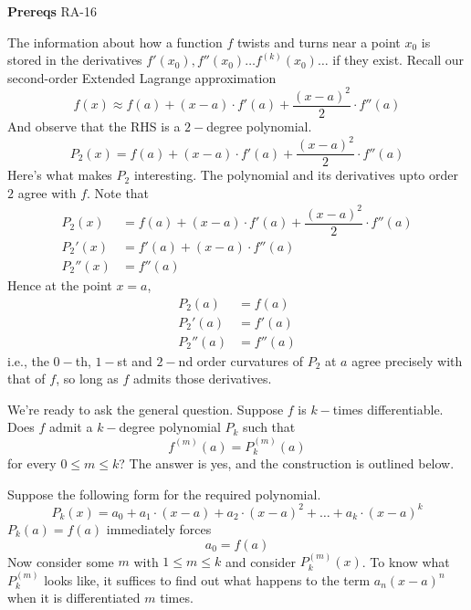 

\textbf{Prereqs} RA-16

The information about how a function $f$ twists and turns near a point $x_0$ is stored in the derivatives $f'(x_0), f''(x_0) \ldots f^{(k)}(x_0) \ldots$ if they exist. Recall our second-order Extended Lagrange approximation
$$
f(x) \approx f(a) + (x - a)\cdot f'(a) + \dfrac{(x - a)^2}{2}\cdot f''(a)
$$
And observe that the RHS is a $2-$degree polynomial.
$$
P_2(x) = f(a) + (x - a)\cdot f'(a) + \dfrac{(x - a)^2}{2}\cdot f''(a)
$$
Here's what makes $P_2$ interesting. The polynomial and its derivatives upto order $2$ agree with $f$. Note that
\begin{align*}
P_2(x) &= f(a) + (x - a)\cdot f'(a) + \dfrac{(x - a)^2}{2}\cdot f''(a)\\
P_2'(x) &= f'(a) + (x - a)\cdot f''(a)\\
P_2''(x) &= f''(a)
\end{align*}
Hence at the point $x = a$,
\begin{align*}
P_2(a) &= f(a)\\
P_2'(a) &= f'(a)\\
P_2''(a) &= f''(a)
\end{align*}
i.e., the $0-$th, $1-$st and $2-$nd order curvatures of $P_2$ at $a$ agree precisely with that of $f$, so long as $f$ admits those derivatives.

We're ready to ask the general question. Suppose $f$ is $k-$times differentiable. Does $f$ admit a $k-$degree polynomial $P_k$ such that
$$
f^{(m)}(a) = P_k^{(m)}(a)
$$
for every $0 \leq m \leq k$? The answer is yes, and the construction is outlined below.

Suppose the following form for the required polynomial.
$$
P_k(x) = a_0 + a_1\cdot (x - a) + a_2\cdot (x - a)^2 + \ldots + a_k\cdot (x - a)^k
$$
$P_k(a) = f(a)$ immediately forces
$$
a_0 = f(a)
$$
Now consider some $m$ with $1 \leq m \leq k$ and consider $P_k^{(m)}(x)$. To know what $P_k^{(m)}$ looks like, it suffices to find out what happens to the term $a_n(x - a)^n$ when it is differentiated $m$ times.

